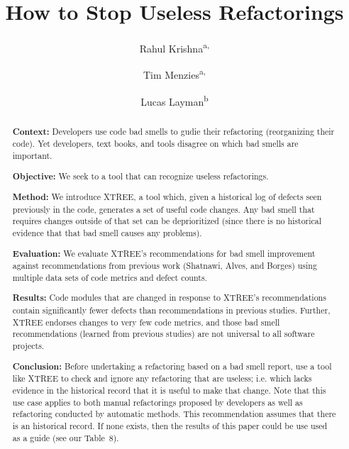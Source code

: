 \documentclass[twocolumn,5p]{elsarticle}
\theoremstyle{break}
\begin{document}
\begin{frontmatter}

\title{How to Stop Useless Refactorings}

\author{Rahul Krishna\textsuperscript{a,}}
\author{Tim Menzies\textsuperscript{a,}}
\author{Lucas Layman\textsuperscript{b}}
\address{\textsuperscript{a}Department of Computer Science, North Carolina State University, Raleigh, NC, USA\\
\textsuperscript{b}Fraunhofer CESE, College Park, USA}

\begin{abstract} 
{\bf Context: } 
Developers use code bad smells to gudie their refactoring (reorganizing their code).
Yet developers, text books, and tools disagree on which bad smells are important.

\noindent 
{\bf Objective: } We seek to a tool that can recognize  useless refactorings.

\noindent
{\bf Method: } We introduce XTREE, a tool which, given a historical log of defects seen previously in the code, generates
a set of useful code changes.
Any bad smell that requires changes outside of that set can be deprioritized 
(since there is no
historical evidence that that bad smell causes any problems).

\noindent
{\bf Evaluation: } We evaluate XTREE's recommendations for bad smell improvement against recommendations from previous work (Shatnawi, Alves, and Borges) using multiple data sets of code metrics and defect counts.  

\noindent
{\bf Results: }Code modules that are changed in response to XTREE's recommendations contain significantly fewer defects than recommendations in previous studies. Further, XTREE endorses changes to very few code metrics, and those bad smell recommendations (learned from previous studies) are not universal to all  software projects.

\noindent
{\bf Conclusion: }
Before undertaking a refactoring based on a bad smell report,
use a tool like XTREE to check and ignore any refactoring   that  are useless; i.e. which lacks evidence
  in the historical record  that it is useful to make that change.
  Note that this use case applies to both manual refactorings proposed by developers
as well as refactoring  conducted by automatic methods.
This recommendation assumes that there is an historical record.
If none exists, then the results of this paper could be use used as a guide (see our
Table~8). 


\end{abstract}
\end{frontmatter}
\end{document}

